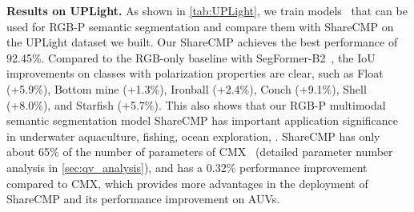 \documentclass[10pt,twocolumn,letterpaper]{article}
\begin{document}
\medskip
\noindent
\textbf{Results on UPLight.}
As shown in \cref{tab:UPLight}, we train models~\cite{zju,mcubes,cmx} that can be used for RGB-P semantic segmentation and compare them with ShareCMP on the UPLight dataset we built. Our ShareCMP achieves the best performance of 92.45\%. Compared to the RGB-only baseline with SegFormer-B2~\cite{26}, the IoU improvements on classes with polarization properties are clear, such as Float (+5.9\%), Bottom mine (+1.3\%), Ironball (+2.4\%), Conch (+9.1\%), Shell (+8.0\%), and Starfish (+5.7\%). This also shows that our RGB-P multimodal semantic segmentation model ShareCMP has important application significance in underwater aquaculture, fishing, ocean exploration, \etc. ShareCMP has only about 65\% of the number of parameters of CMX~\cite{cmx} (detailed parameter number analysis in \cref{sec:qv_analysis}), and has a 0.32\% performance improvement compared to CMX, which provides more advantages in the deployment of ShareCMP and its performance improvement on AUVs.
\end{document}
